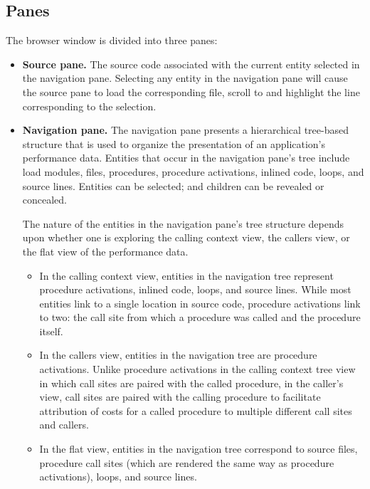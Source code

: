 \documentclass[english]{article}
\begin{document}
\subsection{Panes}

The browser window is divided into three panes:

\begin{itemize}
  \item \textbf{Source pane.} The source code associated with the current entity selected in the navigation pane.
Selecting any entity in the navigation pane will cause the source pane to load the corresponding file, scroll to and highlight the line corresponding to the selection.

\item \textbf{Navigation pane.}
The navigation pane presents a hierarchical tree-based structure that is used to organize the presentation of an application's performance data.
Entities that occur in the navigation pane's tree include load modules, files, procedures, procedure activations, inlined code, loops, and source lines.
Entities can be selected; and children can be revealed or concealed.

The nature of the entities in the navigation pane's tree structure depends upon whether one is exploring the calling context view, the callers view, or the flat view of the performance data. 

\begin{itemize}
\item In the calling context view, entities in the navigation tree represent procedure activations, inlined code, loops, and source lines. 
While most entities link to a single location in source code, procedure activations link to two: the call site from which a procedure was called and the procedure itself.
\item In the callers view, entities in the navigation tree are procedure activations. Unlike procedure activations in the calling context tree view in which call sites are paired with the called procedure, in the caller's view, call sites are paired with the calling procedure to facilitate attribution of costs for a called procedure to multiple different call sites and callers.
\item In the flat view, entities in the navigation tree correspond to source files, procedure call sites (which are rendered the same way as procedure activations), loops, and source lines.
\end{itemize}



\end{itemize}
\end{document}
